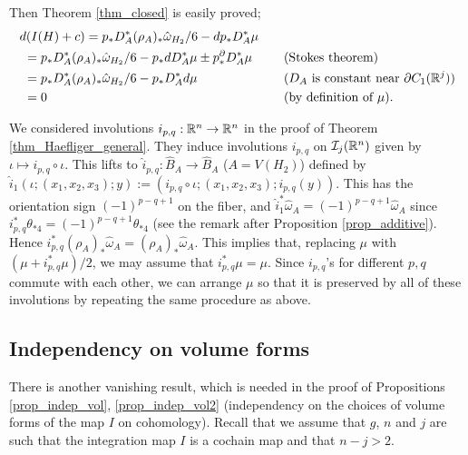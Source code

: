 Then Theorem \ref{thm_closed} is easily proved;
\begin{alignat*}{2}
 &d(I(H)+c) = p_* D^*_A (\rho_A )_* \hat{\omega}_{H_2}/6 -dp_* D^*_A \mu & \quad & \\
 &\ = p_* D^*_A (\rho_A )_* \hat{\omega}_{H_2}/6 -p_* dD^*_A \mu \pm p^{\partial}_* D^*_A \mu & \quad &
  \text{(Stokes theorem)} \\
 &\ = p_* D^*_A (\rho_A )_* \hat{\omega}_{H_2}/6 -p_* D^*_A d\mu & \quad & (D_A \text{ is constant near }
  \partial C_1 (\mathbb{R}^j ))\\
 &\ =0 & \quad & \text{(by definition of }\mu ).
\end{alignat*}


\begin{rem}\label{rem_mu_symmetric}
We considered involutions $i_{p,q} : \mathbb{R}^n \to \mathbb{R}^n$ in the proof of Theorem \ref{thm_Haefliger_general}.
They induce involutions $i_{p,q}$ on $\mathcal{I}_j (\mathbb{R}^n )$ given by $\iota \mapsto i_{p,q} \circ \iota$.
This lifts to $\hat{i}_{p,q} : \hat{B}_A \to \hat{B}_A$ ($A=V(H_2 )$) defined by
$ \hat{i}_1 (\iota ;(x_1 ,x_2 ,x_3 );y) := (i_{p,q} \circ \iota ;(x_1 ,x_2 ,x_3 );i_{p,q} (y))$.
This has the orientation sign $(-1)^{p-q+1}$ on the fiber, and $\hat{i}^*_1 \hat{\omega}_A =(-1)^{p-q+1}\hat{\omega}_A$
since $i^*_{p,q} \theta_{*4}=(-1)^{p-q+1}\theta_{*4}$ (see the remark after Proposition \ref{prop_additive}).
Hence $i^*_{p,q} (\rho_A )_* \hat{\omega}_A =(\rho_A )_* \hat{\omega}_A$.
This implies that, replacing $\mu$ with $(\mu +i^*_{p,q} \mu )/2$, we may assume that $i^*_{p,q} \mu =\mu$.
Since $i_{p,q}$'s for different $p,q$ commute with each other, we can arrange $\mu$ so that it is preserved by all of these
involutions by repeating the same procedure as above.
\end{rem}





\subsection{Independency on volume forms}\label{subsec_indep_vol}


There is another vanishing result, which is needed in the proof of Propositions \ref{prop_indep_vol},
\ref{prop_indep_vol2} (independency on the choices of volume forms of the map $I$ on cohomology).
Recall that we assume that $g$, $n$ and $j$ are such that the integration map $I$ is a cochain map and that $n-j>2$.



